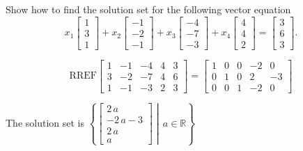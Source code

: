 
\begin{exerciseStatement}


Show how to find the solution set for the following vector equation \[ x_{1} \left[\begin{array}{c}
1 \\
3 \\
1
\end{array}\right] + x_{2} \left[\begin{array}{c}
-1 \\
-2 \\
-1
\end{array}\right] + x_{3} \left[\begin{array}{c}
-4 \\
-7 \\
-3
\end{array}\right] + x_{4} \left[\begin{array}{c}
4 \\
4 \\
2
\end{array}\right] = \left[\begin{array}{c}
3 \\
6 \\
3
\end{array}\right] .\]


\end{exerciseStatement}
    
\begin{exerciseAnswer} 
\[\mathrm{RREF} \left[\begin{array}{cccc|c}
1 & -1 & -4 & 4 & 3 \\
3 & -2 & -7 & 4 & 6 \\
1 & -1 & -3 & 2 & 3
\end{array}\right]  =  \left[\begin{array}{cccc|c}
1 & 0 & 0 & -2 & 0 \\
0 & 1 & 0 & 2 & -3 \\
0 & 0 & 1 & -2 & 0
\end{array}\right] \]

The solution set is \( \left\{ \left[\begin{array}{c}
2 \, a \\
-2 \, a - 3 \\
2 \, a \\
a
\end{array}\right] \middle|\,a\in\mathbb{R}\right\} \)


\end{exerciseAnswer}
    
